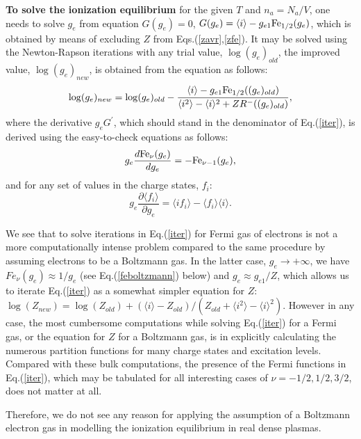 {\bf To solve the ionization equilibrium} for the given $T$ and $n_a=N_a/V$, one needs to solve $g_e$ from equation $G(g_e)=0$, 
$G(g_e)=\langle i\rangle-g_{e1}{\rm Fe}_{1/2}(g_e)$, which is obtained by means of excluding $Z$ from Eqs.(\ref{zavr},\ref{zfe}). 
It may be solved using the Newton-Rapson iterations with any trial value, $\log(g_e)_{old}$, the improved value, $\log(g_e)_{new}$, 
is obtained from the equation as follows:
\begin{equation}\label{iter}
\log(g_e)_{new}=%
\log(g_e)_{old}-\frac{\langle i\rangle-g_{e1}{\rm Fe}_{1/2}((g_e)_{old})}{
\langle i^2\rangle-\langle i\rangle^2+ Z R^-((g_e)_{old}) },
\end{equation}
where the derivative $g_eG^\prime$, which should stand in the denominator of 
Eq.(\ref{iter}), is derived using the easy-to-check equations as follows:
\begin{equation}
g_e\frac{d{\rm Fe}_\nu(g_e)}{dg_e}=-{\rm Fe}_{\nu-1}(g_e),
\end{equation}
and for any set of values in the charge states, $f_i$:
\begin{equation}
g_e\frac{\partial\langle f_i\rangle}{\partial g_e}=\langle if_i\rangle-\langle f_i\rangle\langle i\rangle.
\end{equation}

We see that to solve iterations in Eq.(\ref{iter}) for Fermi gas of electrons is not a
more computationally intense problem compared to the same procedure by assuming electrons 
to be a Boltzmann gas. In the latter case, $g_e \to +\infty$, we have $Fe_\nu(g_e) \approx 1/g_e$
(see Eq.(\ref{feboltzmann}) below) and $g_e \approx g_{e1}/Z$, which allows us to iterate Eq.(\ref{iter})
as a somewhat simpler equation for $Z$:
$\log (Z_{new})=\log(Z_{old})+(\langle i\rangle-Z_{old})/(Z_{old}+\langle i^2\rangle-\langle i\rangle^2)$. However in any case, the most cumbersome computations 
while solving Eq.(\ref{iter}) for a Fermi gas, or the equation for $Z$ for a Boltzmann gas, is in explicitly calculating the 
numerous partition functions for many charge
states and excitation levels. Compared with these bulk computations, the presence of the Fermi functions in Eq.(\ref{iter}), which may be tabulated 
for all interesting cases of $\nu=-1/2,1/2,3/2$, %
does not matter at all.

Therefore, we 
do not see any reason for applying the assumption of a Boltzmann electron gas in modelling the ionization equilibrium
in real dense plasmas.


